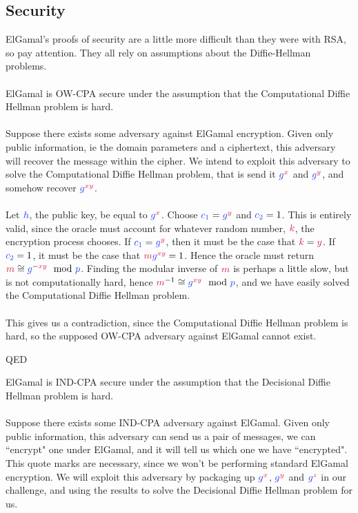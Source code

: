 	\subsection{Security}
	ElGamal's proofs of security are a little more difficult than they were with RSA, so pay attention. They all rely on assumptions about the Diffie-Hellman problems.\\
\\
	ElGamal is OW-CPA secure under the assumption that the Computational Diffie Hellman problem is hard.\\
\\
	Suppose there exists some adversary against ElGamal encryption. Given only public information, ie the domain parameters and a ciphertext, this adversary will recover the message within the cipher. We intend to exploit this adversary to solve the Computational Diffie Hellman problem, that is send it $\blue{g}^\red{x}$ and $\blue{g}^\red{y}$, and somehow recover $\blue{g}^\red{xy}$.\\
\\
	Let $\blue{h}$, the public key, be equal to $\blue{g}^\red{x}$. Choose $\blue{c_1} = \blue{g}^\red{y}$ and $\blue{c_2} = 1$. This is entirely valid, since the oracle must account for whatever random number, $\red{k}$, the encryption process chooses. If $\blue{c_1} = \blue{g}^\red{y}$, then it must be the case that $\red{k}=\red{y}$. If $\blue{c_2}=1$, it must be the case that $\red{m}\blue{g}^{\red{xy}} = 1$. Hence the oracle must return $\red{m} \cong \blue{g}^{-\red{xy}} \mod \blue{p}$. Finding the modular inverse of $\red{m}$ is perhaps a little slow, but is not computationally hard, hence $\red{m}^{-1} \cong \blue{g}^{\red{xy}} \mod \blue{p}$, and we have easily solved the Computational Diffie Hellman problem.\\
\\
	This gives us a contradiction, since the Computational Diffie Hellman problem is hard, so the supposed OW-CPA adversary against ElGamal cannot exist.
\begin{flushright}
QED\\
\end{flushright}
	ElGamal is IND-CPA secure under the assumption that the Decisional Diffie Hellman problem is hard.\\
\\
	Suppose there exists some IND-CPA adversary against ElGamal. Given only public information, this adversary can send us a pair of messages, we can ``encrypt" one under ElGamal, and it will tell us which one we have ``encrypted". This quote marks are necessary, since we won't be performing standard ElGamal encryption. We will exploit this adversary by packaging up $\blue{g}^\red{x}$, $\blue{g}^\red{y}$ and $\blue{g}^\red{z}$ in our challenge, and using the results to solve the Decisional Diffie Hellman problem for us.\\
